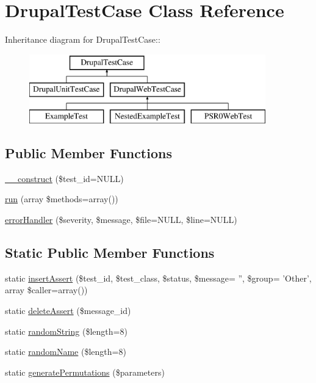 \hypertarget{classDrupalTestCase}{
\section{DrupalTestCase Class Reference}
\label{classDrupalTestCase}
}
Inheritance diagram for DrupalTestCase::\begin{figure}[H]
\begin{center}
\leavevmode
\includegraphics[height=3cm]{classDrupalTestCase}
\end{center}
\end{figure}
\subsection*{Public Member Functions}
\begin{DoxyCompactItemize}
\item 
\hyperlink{classDrupalTestCase_abb2516192da25b89bec5f5a4a7e91aab}{\_\-\_\-construct} (\$test\_\-id=NULL)
\item 
\hyperlink{classDrupalTestCase_a043a6e875fb5f23250b64d6afee79afc}{run} (array \$methods=array())
\item 
\hyperlink{classDrupalTestCase_aaddb077405f3177d94d44b690b1d869f}{errorHandler} (\$severity, \$message, \$file=NULL, \$line=NULL)
\end{DoxyCompactItemize}
\subsection*{Static Public Member Functions}
\begin{DoxyCompactItemize}
\item 
static \hyperlink{classDrupalTestCase_add756d567d09f64668d57eb02be5b9fe}{insertAssert} (\$test\_\-id, \$test\_\-class, \$status, \$message= '', \$group= 'Other', array \$caller=array())
\item 
static \hyperlink{classDrupalTestCase_a1a5ada7d27370a7788be5b97d280ebab}{deleteAssert} (\$message\_\-id)
\item 
static \hyperlink{classDrupalTestCase_abfa086de79b5d644f10d4bd4d828136c}{randomString} (\$length=8)
\item 
static \hyperlink{classDrupalTestCase_ab1137ec76434cdd38ec267977ba153d5}{randomName} (\$length=8)
\item 
static \hyperlink{classDrupalTestCase_a9d52ee8295c97dbb85abb2ab4f901e7e}{generatePermutations} (\$parameters)
\end{DoxyCompactItemize}
